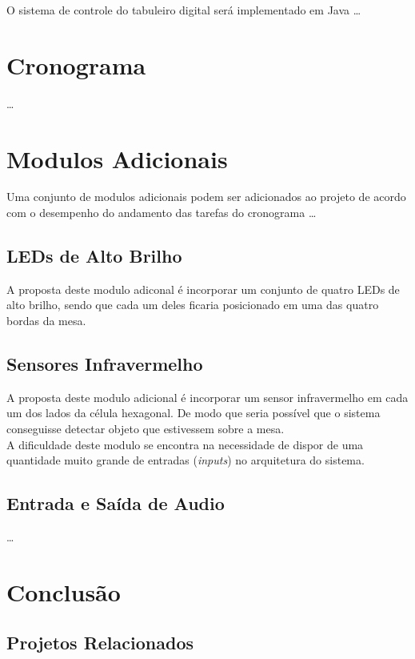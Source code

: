 \documentclass[a4paper,10pt]{article}
\begin{document}
O sistema de controle do tabuleiro digital será implementado em Java \ldots

\section{Cronograma}

\ldots

\section{Modulos Adicionais}

Uma conjunto de modulos adicionais podem ser adicionados ao projeto de acordo com o desempenho do andamento das tarefas do cronograma \ldots

\subsection{LEDs de Alto Brilho}

A proposta deste modulo adiconal é incorporar um conjunto de quatro LEDs de alto brilho, sendo que cada um deles ficaria posicionado em uma das quatro bordas da mesa.

\subsection{Sensores Infravermelho}

A proposta deste modulo adicional é incorporar um sensor infravermelho em cada um dos lados da célula hexagonal. De modo que seria possível que o sistema conseguisse detectar objeto que estivessem sobre a mesa. \\

A dificuldade deste modulo se encontra na necessidade de dispor de uma quantidade muito grande de entradas ({\it inputs}) no arquitetura do sistema.

\subsection{Entrada e Saída de Audio}

\ldots

\section{Conclusão}

\subsection{Projetos Relacionados}
\end{document}
